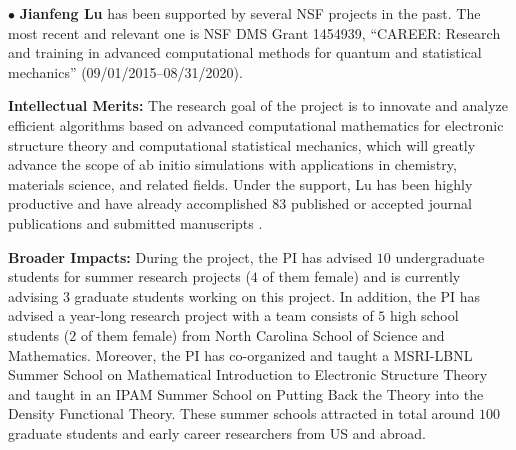 \documentclass[12pt]{article}
\begin{document}
\noindent
$\bullet$
\textbf{Jianfeng Lu} has been supported by several NSF projects in the
past. The most recent and relevant one is NSF DMS Grant 1454939,
``CAREER: Research and training in advanced computational methods for
quantum and statistical mechanics'' (09/01/2015--08/31/2020).

\smallskip
\textbf{Intellectual Merits:} The research goal of the
project is to innovate and analyze efficient algorithms based on
advanced computational mathematics for electronic structure theory and
computational statistical mechanics, which will greatly advance the
scope of ab initio simulations with applications in chemistry,
materials science, and related fields.  Under the support, Lu has been
highly productive and have already accomplished $83$ published or
accepted journal publications \cite{DelgadilloLuYang:16, LinLu:16,
  LiLu:16, LuYing:16f, LiLuSun:17, YuLuAbramsVandenEijnden:16,
  LuWirthYang:16, LuYing:16, LaiLu:16, LiLuYang:15, LuYing:15,
  LuZhou:16, CornelisYang:17, LiLinLu:18, LuYang:17,
  MendlLuLukkarinen:16, NiuLuoLuXiang:17, LiLuSun:17v, GaoLiuLu:17,
  LuThicke:17, GaoLiuLu:17w, WatsonLuWeinstein:17,
  LinLuVandenEijnden:18, LuYang:17c, XLiLu:17, LiLuYang:17, QLiLu:17,
  LuZhou:18, DaiLiLu:18, LuSteinerberger:17, YuCorsetti:18,
  LiLiuLu:17, LiLiuLuZhou:18, LuThicke:17c, GaucklerMarzuola:19,
  CaoLu:17, LaiLu:18, DuLiLuTian:18, HuangLuMing:18, LuZhou:18a,
  CaiLu:18surface, DelgadilloLuYang:18, ChenLuOrtner:18, LuYang:18,
  CaiLu:18qkmc, CaoLu:18, LuSteinerberger:18, BarthelLu:18, FangLu:18,
  YouLiLuGe:18, MartinssonLu:19, LuSachsSteinerberger:19+,
  WangLiLu:19, LuSoggeSteinerberger:19, ChenLiLu:19+,
  LuSteinerberger:19+, CaiLuYang:19+, LuSpiliopoulos:18, AnLuYing:19+,
  CaoLuLu:19FP, CaoLuLu:19Lindblad, ChenLiLuWright:19+, HuangLiuLu:19,
  KhooLuYing:19, LiLuWang:19, LiLu:19, LiuLuMargetisMarzuola:19,
  LuLuNolen:19, LuVandenEijnden:19, LuWang:19+, NishimuraDunsonLu:19+,
  ZhuQiuWang:19+, CaoLu:19+} and submitted manuscripts
\cite{CaiLuStubbs, KhooLuYing:uq, LiChengLu, LuOtto,
  LuWatsonWeinstein, ChenLiLuWright:b, LuSteinerberger, LiLuWang,
  ChenLiLuWright, SenSachsLuDunson, AgazziLu, LuLuNolen, ChenLiLu,
  LiLuMao, GaoLiuLuMarzuola, AnHead-GordonLinLu, LiLiLiuLiuLu,
  HolstHu, LiLuMattinglyWang, LuZhou, ThickeWatsonLu, GeLeeLi}.


\smallskip
\textbf{Broader Impacts:} During the  project, the PI has advised $10$ undergraduate students for
summer research projects ($4$ of them female) and is currently
advising $3$ graduate students working on this project. In addition,
the PI has advised a year-long research project with a team consists
of $5$ high school students ($2$ of them female) from North Carolina
School of Science and Mathematics.  Moreover, the PI
has co-organized and taught a MSRI-LBNL Summer School on Mathematical
Introduction to Electronic Structure Theory and taught in an IPAM
Summer School on Putting Back the Theory into the Density Functional
Theory. These summer schools attracted in total around $100$ graduate
students and early career researchers from US and abroad.
\end{document}
